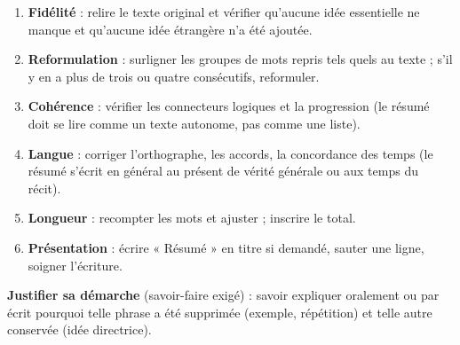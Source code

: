\documentclass[11pt]{article}
\begin{document}
\begin{methode}
\begin{enumerate}
\item \textbf{Fidélité} : relire le texte original et vérifier qu'aucune idée essentielle ne manque et qu'aucune idée étrangère n'a été ajoutée.
\item \textbf{Reformulation} : surligner les groupes de mots repris tels quels au texte ; s'il y en a plus de trois ou quatre consécutifs, reformuler.
\item \textbf{Cohérence} : vérifier les connecteurs logiques et la progression (le résumé doit se lire comme un texte autonome, pas comme une liste).
\item \textbf{Langue} : corriger l'orthographe, les accords, la concordance des temps (le résumé s'écrit en général au présent de vérité générale ou aux temps du récit).
\item \textbf{Longueur} : recompter les mots et ajuster ; inscrire le total.
\item \textbf{Présentation} : écrire « Résumé » en titre si demandé, sauter une ligne, soigner l'écriture.
\end{enumerate}
\textbf{Justifier sa démarche} (savoir-faire exigé) : savoir expliquer oralement ou par écrit pourquoi telle phrase a été supprimée (exemple, répétition) et telle autre conservée (idée directrice).
\end{methode}
\end{document}
